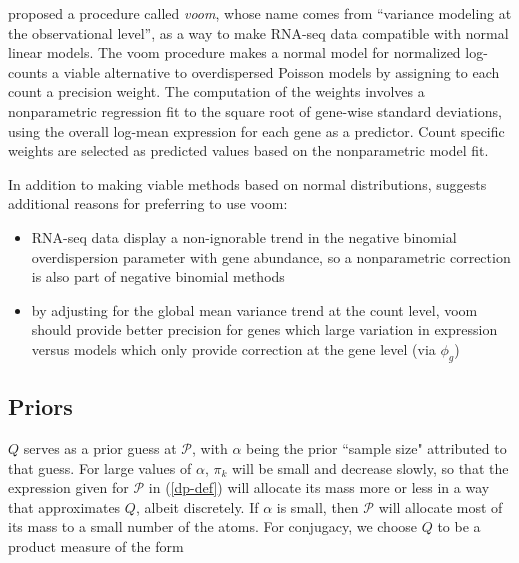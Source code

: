 
\cite{voom} proposed a procedure called \textit{voom}, whose name comes from ``variance modeling at the observational level'', as a way to make RNA-seq data compatible with normal linear models. The voom procedure makes a normal model for normalized log-counts a viable alternative to overdispersed Poisson models by assigning to each count a precision weight. The computation of the weights involves a nonparametric regression fit to the square root of gene-wise standard deviations, using the overall log-mean expression for each gene as a predictor. Count specific weights are selected as predicted values based on the nonparametric model fit.

In addition to making viable methods based on normal distributions, \citet{voom} suggests additional reasons for preferring to use voom:
\begin{itemize}
\item RNA-seq data display a non-ignorable trend in the negative binomial overdispersion parameter with gene abundance, so a nonparametric correction is also part of negative binomial methods
\item by adjusting for the global mean variance trend at the count level, voom should provide better precision for genes which large variation in expression versus models which only provide correction at the gene level (via $\phi_g$)
\end{itemize}


\subsection{Priors}
$Q$ serves as a prior guess at $\mathcal{P}$, with $\alpha$ being the prior ``sample size" attributed to that guess. For large values of $\alpha$, $\pi_k$ will be small and decrease slowly, so that the expression given for $\mathcal{P}$ in (\ref{dp-def}) will allocate its mass more or less in a way that approximates $Q$, albeit discretely. If $\alpha$ is small, then $\mathcal{P}$ will allocate most of its mass to a small number of the atoms. For conjugacy, we choose $Q$ to be a product measure of the form


